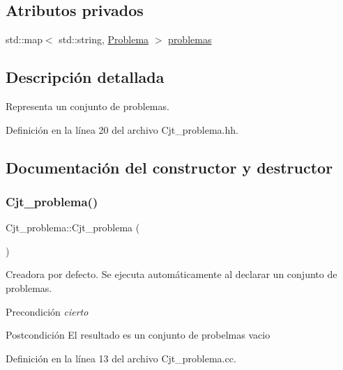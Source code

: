 \subsection*{Atributos privados}
\begin{DoxyCompactItemize}
\item 
std\+::map$<$ std\+::string, \mbox{\hyperlink{class_problema}{Problema}} $>$ \mbox{\hyperlink{class_cjt__problema_a2d471986320805c5b27f8d14d486fca8}{problemas}}
\end{DoxyCompactItemize}


\subsection{Descripción detallada}
Representa un conjunto de problemas. 

Definición en la línea 20 del archivo Cjt\+\_\+problema.\+hh.



\subsection{Documentación del constructor y destructor}
\mbox{\label{class_cjt__problema_ae278b02c810f660bdbe970841ca8f166}} 
\subsubsection{\texorpdfstring{Cjt\+\_\+problema()}{Cjt\_problema()}}
{\footnotesize\ttfamily Cjt\+\_\+problema\+::\+Cjt\+\_\+problema (\begin{DoxyParamCaption}{ }\end{DoxyParamCaption})}



Creadora por defecto. Se ejecuta automáticamente al declarar un conjunto de problemas. 

\begin{DoxyPrecond}{Precondición}
{\itshape cierto} 
\end{DoxyPrecond}
\begin{DoxyPostcond}{Postcondición}
El resultado es un conjunto de probelmas vacio 
\end{DoxyPostcond}


Definición en la línea 13 del archivo Cjt\+\_\+problema.\+cc.



